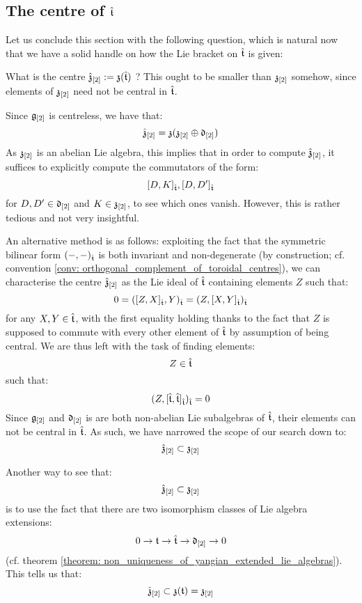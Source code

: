     \subsection{The centre of \texorpdfstring{$\hat{\mathfrak{t}}$}{}}
        Let us conclude this section with the following question, which is natural now that we have a solid handle on how the Lie bracket on $\hat{\mathfrak{t}}$ is given:
        \begin{question}
            What is the centre $\hat{\mathfrak{z}}_{[2]} := \mathfrak{z}( \hat{\mathfrak{t}} )$ ? This ought to be smaller than $\mathfrak{z}_{[2]}$ somehow, since elements of $\mathfrak{z}_{[2]}$ need not be central in $\hat{\mathfrak{t}}$. 
        \end{question}
        \begin{remark}
            Since $\mathfrak{g}_{[2]}$ is centreless, we have that:
                $$\hat{\mathfrak{z}}_{[2]} = \mathfrak{z}( \mathfrak{z}_{[2]} \oplus \mathfrak{d}_{[2]} )$$
            As $\mathfrak{z}_{[2]}$ is an abelian Lie algebra, this implies that in order to compute $\hat{\mathfrak{z}}_{[2]}$, it suffices to explicitly compute the commutators of the form:
                $$[D, K]_{\hat{\mathfrak{t}}}, [D, D']_{\hat{\mathfrak{t}}}$$
            for $D, D' \in \mathfrak{d}_{[2]}$ and $K \in \mathfrak{z}_{[2]}$, to see which ones vanish. However, this is rather tedious and not very insightful.
            
            An alternative method is as follows: exploiting the fact that the symmetric bilinear form $(-, -)_{\hat{\mathfrak{t}}}$ is both invariant and non-degenerate (by construction; cf. convention \ref{conv: orthogonal_complement_of_toroidal_centres}), we can characterise the centre $\hat{\mathfrak{z}}_{[2]}$ as the Lie ideal of $\hat{\mathfrak{t}}$ containing elements $Z$ such that:
                $$0 = ([Z, X]_{\hat{\mathfrak{t}}}, Y)_{\hat{\mathfrak{t}}} = (Z, [X, Y]_{\hat{\mathfrak{t}}})_{\hat{\mathfrak{t}}}$$
            for any $X, Y \in \hat{\mathfrak{t}}$, with the first equality holding thanks to the fact that $Z$ is supposed to commute with every other element of $\hat{\mathfrak{t}}$ by assumption of being central. We are thus left with the task of finding elements:
                $$Z \in \hat{\mathfrak{t}}$$
            such that:
                $$(Z, [\hat{\mathfrak{t}}, \hat{\mathfrak{t}}]_{\hat{\mathfrak{t}}})_{\hat{\mathfrak{t}}} = 0$$
            Since $\mathfrak{g}_{[2]}$ and $\mathfrak{d}_{[2]}$ is are both non-abelian Lie subalgebras of $\hat{\mathfrak{t}}$, their elements can not be central in $\hat{\mathfrak{t}}$. As such, we have narrowed the scope of our search down to:
                $$\hat{\mathfrak{z}}_{[2]} \subset \mathfrak{z}_{[2]}$$

            Another way to see that:
                $$\hat{\mathfrak{z}}_{[2]} \subset \mathfrak{z}_{[2]}$$
            is to use the fact that there are two isomorphism classes of Lie algebra extensions:
                $$0 \to \mathfrak{t} \to \hat{\mathfrak{t}} \to \mathfrak{d}_{[2]} \to 0$$
            (cf. theorem \ref{theorem: non_uniqueness_of_yangian_extended_lie_algebras}). This tells us that:
                $$\hat{\mathfrak{z}}_{[2]} \subset \mathfrak{z}(\mathfrak{t}) = \mathfrak{z}_{[2]}$$
        \end{remark}
